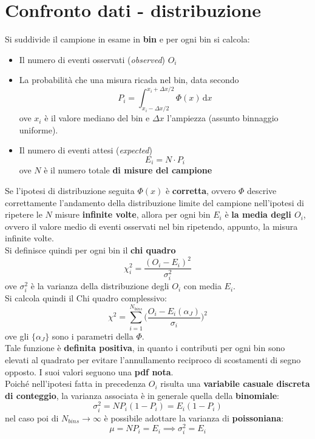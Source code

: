 \documentclass[10pt, oneside]{book}
\newcommand{\integral}[4]{\int_{#1}^{#2} #3 \, \mathrm{d}#4}
\begin{document}
\section{Confronto dati - distribuzione}
Si suddivide il campione in esame in \textbf{bin} e per ogni bin si calcola:
\begin{itemize}
\item Il numero di eventi osservati (\textit{observed}) $O_i$
\item La probabilità che una misura ricada nel bin, data secondo
\[P_i = \integral{x_i - \Delta x/2}{x_i + \Delta x/2}{\Phi(x)}{x}\]
ove $x_i$ è il valore mediano del bin e $\Delta x$ l'ampiezza (assunto binnaggio uniforme).
\item Il numero di eventi attesi (\textit{expected})
\[E_i = N \cdot P_i\]
ove $N$ è il numero totale \textbf{di misure del campione}
\end{itemize}
Se l'ipotesi di distribuzione seguita $\Phi(x)$ è \textbf{corretta}, ovvero $\Phi$ descrive correttamente l'andamento della distribuzione limite del campione nell'ipotesi di ripetere le $N$ misure \textbf{infinite volte}, allora per ogni bin $E_i$ è \textbf{la media degli $O_i$}, ovvero il valore medio di eventi osservati nel bin ripetendo, appunto, la misura infinite volte.\\
Si definisce quindi per ogni bin il \textbf{chi quadro}
\[\chi_i^2 = \frac{(O_i - E_i)^2}{\sigma_i^2}\]
ove $\sigma_i^2$ è la varianza della distribuzione degli $O_i$ con media $E_i$.\\
Si calcola quindi il Chi quadro complessivo:
\[\chi^2 = \sum\limits_{i=1}^{N_{bins}} \bigg(\frac{O_i - E_i(\alpha_J)}{\sigma_i}\bigg)^2\]
ove gli $\{\alpha_J\}$ sono i parametri della $\Phi$.\\
Tale funzione è \textbf{definita positiva}, in quanto i contributi per ogni bin sono elevati al quadrato per evitare l'annullamento reciproco di scostamenti di segno opposto. I suoi valori seguono una \textbf{pdf nota}.\\Poiché nell'ipotesi fatta in precedenza $O_i$ risulta una \textbf{variabile casuale discreta di conteggio}, la varianza associata è in generale quella della \textbf{binomiale}:
\[\sigma_i^2 = N P_i (1-P_i) = E_i (1-P_i)\]
nel caso poi di $N_{bins} \rightarrow \infty$ è possibile adottare la varianza di \textbf{poissoniana}:
\[\mu = N P_i = E_i \implies \sigma_i^2 = E_i\]
\end{document}
